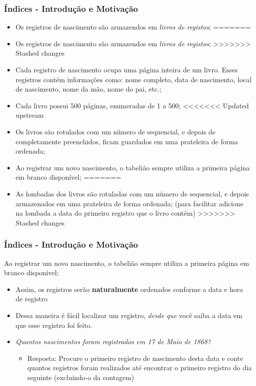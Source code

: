 \documentclass[t, 10pt, aspectratio=169, table, x11names]{beamer}
\begin{document}
	\begin{frame}
		\frametitle{Índices - Introdução e Motivação}
		\begin{itemize}
<<<<<<< Updated upstream
			\item Os  registros de nascimento são armazendos em \textit{livros de registos};
=======
			\item Os registros de nascimento são armazendos em \textit{livros de registos};
>>>>>>> Stashed changes
			\bigskip
			\item Cada registro de nascimento ocupa uma página inteira de um livro. Esses registros contém informações como: nome completo, data de nascimento, local de nascimento, nome da mão, nome do pai, etc.;
			\bigskip
			\item Cada livro possui 500 páginas, enumeradas de 1 a 500;
			\bigskip
<<<<<<< Updated upstream
			\item Os livros são rotulados com um número de sequencial, e depois de completamente preenchidos, ficam guardados em uma prateleira de forma ordenada;
			\bigskip
			\item Ao registrar um novo nascimento, o tabelião sempre utiliza a primeira página em branco disponível;
=======
			\item As lombadas dos livros são rotuladas com um número de sequencial, e depois armazenados em uma prateleira de forma ordenada; (para facilitar adicione na lombada a data do primeiro registro que o livro contém)
>>>>>>> Stashed changes
		\end{itemize}
	\end{frame}

	\begin{frame}
		\frametitle{Índices - Introdução e Motivação}
		\reasonboxbegin{Regra básica}{MaterialTeal800}
			Ao registrar um novo nascimento, o tabelião sempre utiliza a primeira página em branco disponível;
		\reasonboxend
		\begin{itemize}
			\item Assim, os registros serão \textbf{naturalmente} ordenados conforme a data e hora de registro
			\bigskip
			\item Dessa maneira é fácil localizar um registro, \textit{desde que} você saiba a data em que esse registro foi feito.
			\bigskip
			\item \textit{Quantos nascimentos foram registrados em 17 de Maio de 1868?}
			\bigskip
			\begin{itemize}
				\small
				\item Resposta: Procure o primeiro registro de nascimento desta data e conte quantos registros foram realizados até encontrar o primeiro registro do dia seguinte (excluindo-o da contagem)
			\end{itemize}
		\end{itemize}
	\end{frame}
\end{document}
